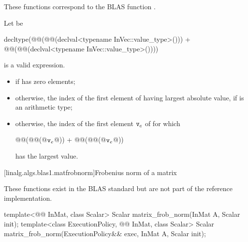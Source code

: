 \begin{itemdescr}
\pnum
\begin{note}
These functions correspond to the BLAS function \supercite{blas1}.
\end{note}

\pnum
Let  be
\begin{codeblock}
decltype(@@(@@(declval<typename InVec::value_type>())) +
         @@(@@(declval<typename InVec::value_type>())))
\end{codeblock}

\pnum
\mandates
{} is a valid expression.

\pnum
\returns
\begin{itemize}
\item
{}
      if  has zero elements;
\item
otherwise, the index of the first element of 
having largest absolute value,
if  is an arithmetic type;
\item
otherwise, the index of the first element $\texttt{\protect v}_e$ of 
for which
\begin{codeblock}
@@(@@(@$\texttt{\protect v}_e$@)) + @@(@@(@$\texttt{\protect v}_e$@))
\end{codeblock}
has the largest value.
\end{itemize}
\end{itemdescr}

[linalg.algs.blas1.matfrobnorm]{Frobenius norm of a matrix}

\pnum
\begin{note}
These functions exist in the BLAS standard\supercite{blas-std}
but are not part of the reference implementation.
\end{note}

%
\begin{itemdecl}
template<@@ InMat, class Scalar>
  Scalar matrix_frob_norm(InMat A, Scalar init);
template<class ExecutionPolicy, @@ InMat, class Scalar>
  Scalar matrix_frob_norm(ExecutionPolicy&& exec, InMat A, Scalar init);
\end{itemdecl}

